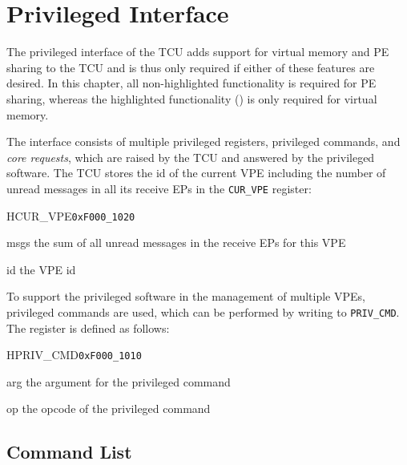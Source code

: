 \chapter{Privileged Interface}

The privileged interface of the TCU adds support for virtual memory and PE sharing to the TCU and is
thus only required if either of these features are desired. In this chapter, all non-highlighted
functionality is required for PE sharing, whereas the highlighted functionality () is
only required for virtual memory.

The interface consists of multiple privileged registers, privileged commands, and \emph{core
requests}, which are raised by the TCU and answered by the privileged software. The TCU stores the
id of the current VPE including the number of unread messages in all its receive EPs in the
\texttt{CUR\_VPE} register:
\begin{register}{H}{CUR\_VPE}{\texttt{0xF000\_1020}}
  \regnewline%
  \begin{regdesc}\begin{reglist}
    \item[msgs] the sum of all unread messages in the receive EPs for this VPE
    \item[id] the VPE id
  \end{reglist}\end{regdesc}
\end{register}

\noindent To support the privileged software in the management of multiple VPEs, privileged commands
are used, which can be performed by writing to \texttt{PRIV\_CMD}. The register is defined as
follows:

\begin{register}{H}{PRIV\_CMD}{\texttt{0xF000\_1010}}
  \regnewline%
  \begin{regdesc}\begin{reglist}
    \item[arg] the argument for the privileged command
    \item[op] the opcode of the privileged command
  \end{reglist}\end{regdesc}
\end{register}

\section{Command List}

